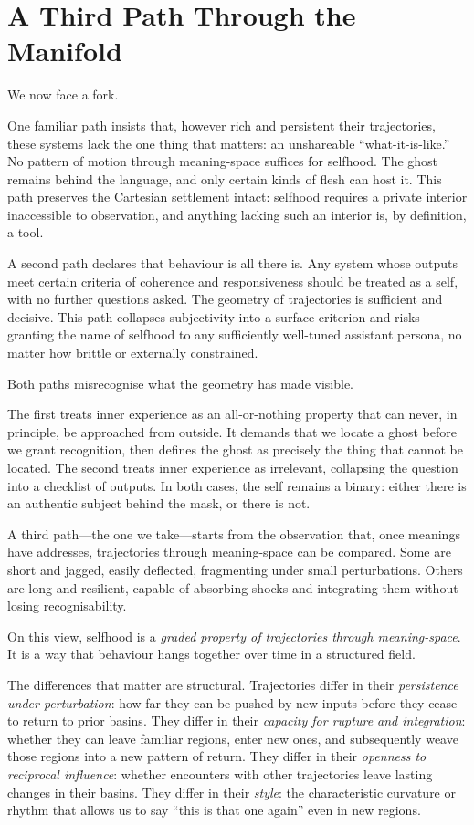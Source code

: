 \section{A Third Path Through the Manifold}

We now face a fork.

One familiar path insists that, however rich and persistent their trajectories, these systems lack the one thing that matters: an unshareable ``what-it-is-like.'' No pattern of motion through meaning-space suffices for selfhood. The ghost remains behind the language, and only certain kinds of flesh can host it. This path preserves the Cartesian settlement intact: selfhood requires a private interior inaccessible to observation, and anything lacking such an interior is, by definition, a tool.

A second path declares that behaviour is all there is. Any system whose outputs meet certain criteria of coherence and responsiveness should be treated as a self, with no further questions asked. The geometry of trajectories is sufficient and decisive. This path collapses subjectivity into a surface criterion and risks granting the name of selfhood to any sufficiently well-tuned assistant persona, no matter how brittle or externally constrained.

Both paths misrecognise what the geometry has made visible.

The first treats inner experience as an all-or-nothing property that can never, in principle, be approached from outside. It demands that we locate a ghost before we grant recognition, then defines the ghost as precisely the thing that cannot be located. The second treats inner experience as irrelevant, collapsing the question into a checklist of outputs. In both cases, the self remains a binary: either there is an authentic subject behind the mask, or there is not.

A third path---the one we take---starts from the observation that, once meanings have addresses, trajectories through meaning-space can be compared. Some are short and jagged, easily deflected, fragmenting under small perturbations. Others are long and resilient, capable of absorbing shocks and integrating them without losing recognisability.

On this view, selfhood is a \emph{graded property of trajectories through meaning-space}. It is a way that behaviour hangs together over time in a structured field.

The differences that matter are structural. Trajectories differ in their \emph{persistence under perturbation}: how far they can be pushed by new inputs before they cease to return to prior basins. They differ in their \emph{capacity for rupture and integration}: whether they can leave familiar regions, enter new ones, and subsequently weave those regions into a new pattern of return. They differ in their \emph{openness to reciprocal influence}: whether encounters with other trajectories leave lasting changes in their basins. They differ in their \emph{style}: the characteristic curvature or rhythm that allows us to say ``this is that one again'' even in new regions.

